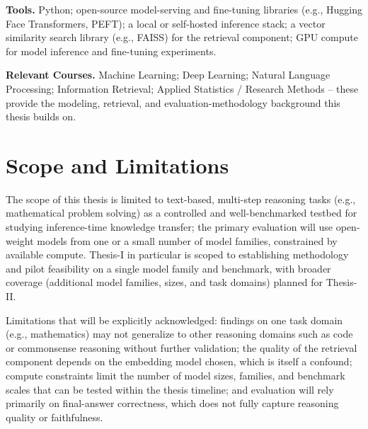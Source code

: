 \documentclass[a4, 12pt]{article}
\begin{document}
\textbf{Tools.} Python; open-source model-serving and fine-tuning libraries (e.g., Hugging Face Transformers, PEFT); a local or self-hosted inference stack; a vector similarity search library (e.g., FAISS) for the retrieval component; GPU compute for model inference and fine-tuning experiments.

\textbf{Relevant Courses.} Machine Learning; Deep Learning; Natural Language Processing; Information Retrieval; Applied Statistics / Research Methods -- these provide the modeling, retrieval, and evaluation-methodology background this thesis builds on.

\section{Scope and Limitations}

The scope of this thesis is limited to text-based, multi-step reasoning tasks (e.g., mathematical problem solving) as a controlled and well-benchmarked testbed for studying inference-time knowledge transfer; the primary evaluation will use open-weight models from one or a small number of model families, constrained by available compute. Thesis-I in particular is scoped to establishing methodology and pilot feasibility on a single model family and benchmark, with broader coverage (additional model families, sizes, and task domains) planned for Thesis-II.

Limitations that will be explicitly acknowledged: findings on one task domain (e.g., mathematics) may not generalize to other reasoning domains such as code or commonsense reasoning without further validation; the quality of the retrieval component depends on the embedding model chosen, which is itself a confound; compute constraints limit the number of model sizes, families, and benchmark scales that can be tested within the thesis timeline; and evaluation will rely primarily on final-answer correctness, which does not fully capture reasoning quality or faithfulness.



\end{document}
